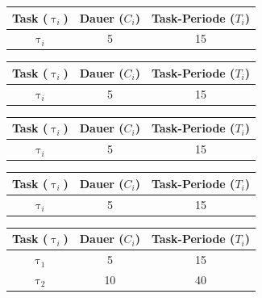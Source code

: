 \begin{frame}{\subsecname}
	\begin{center}
		\begin{tabular}{c||c|c}
			Task ($\uptau_i$) & Dauer ($C_i$) & Task-Periode ($T_i$)\\\hline\hline
			$\uptau_i$ & 5 & 15
		\end{tabular}
	\end{center}
	
\end{frame}

\begin{frame}{\subsecname}
	\begin{center}
		\begin{tabular}{c||c|c}
			Task ($\uptau_i$) & Dauer ($C_i$) & Task-Periode ($T_i$)\\\hline\hline
			$\uptau_i$ & 5 & 15
		\end{tabular}
	\end{center}
	
\end{frame}

\begin{frame}{\subsecname}
	\begin{center}
		\begin{tabular}{c||c|c}
			Task ($\uptau_i$) & Dauer ($C_i$) & Task-Periode ($T_i$)\\\hline\hline
			$\uptau_i$ & 5 & 15
		\end{tabular}
	\end{center}
	
\end{frame}

\begin{frame}{\subsecname}
	\begin{center}
		\begin{tabular}{c||c|c}
			Task ($\uptau_i$) & Dauer ($C_i$) & Task-Periode ($T_i$)\\\hline\hline
			$\uptau_i$ & 5 & 15
		\end{tabular}
	\end{center}
	
\end{frame}

\begin{frame}{\subsecname}
	\begin{center}
		\begin{tabular}{c||c|c}
				Task ($\uptau_i$) & Dauer ($C_i$) & Task-Periode ($T_i$)\\\hline\hline
				$\uptau_1$ & 5 & 15\\
				$\uptau_2$ & 10 & 40\\
		\end{tabular}
	\end{center}	
	
\end{frame}

